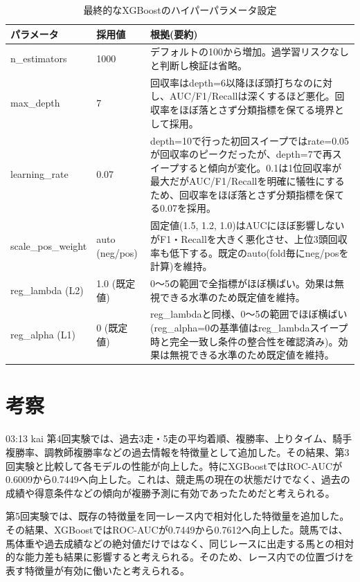 \documentclass[dvipdfmx, a4paper, 11pt, titlepage]{jsarticle}
\begin{document}
\begin{table}[H]
\centering
\caption{最終的なXGBoostのハイパーパラメータ設定}
\begin{tabular}{p{3cm}p{2.5cm}p{8.5cm}}
\toprule
パラメータ & 採用値 & 根拠(要約) \\
\midrule
n\_estimators & 1000 & デフォルトの100から増加。過学習リスクなしと判断し検証は省略。 \\
\addlinespace
max\_depth & 7 & 回収率はdepth=6以降ほぼ頭打ちなのに対し、AUC/F1/Recallは深くするほど悪化。回収率をほぼ落とさず分類指標を保てる境界として採用。 \\
\addlinespace
learning\_rate & 0.07 & depth=10で行った初回スイープではrate=0.05が回収率のピークだったが、depth=7で再スイープすると傾向が変化。0.1は1位回収率が最大だがAUC/F1/Recallを明確に犠牲にするため、回収率をほぼ落とさず分類指標を保てる0.07を採用。 \\
\addlinespace
scale\_pos\_weight & auto (neg/pos) & 固定値(1.5, 1.2, 1.0)はAUCにほぼ影響しないがF1・Recallを大きく悪化させ、上位3頭回収率も低下する。既定のauto(fold毎にneg/posを計算)を維持。 \\
\addlinespace
reg\_lambda (L2) & 1.0 (既定値) & 0〜5の範囲で全指標がほぼ横ばい。効果は無視できる水準のため既定値を維持。 \\
\addlinespace
reg\_alpha (L1) & 0 (既定値) & reg\_lambdaと同様、0〜5の範囲でほぼ横ばい(reg\_alpha=0の基準値はreg\_lambdaスイープ時と完全一致し条件の整合性を確認済み)。効果は無視できる水準のため既定値を維持。 \\
\bottomrule
\end{tabular}
\end{table}

\section{考察}
03:13 kai 第4回実験では、過去3走・5走の平均着順、複勝率、上りタイム、騎手複勝率、調教師複勝率などの過去情報を特徴量として追加した。その結果、第3回実験と比較して各モデルの性能が向上した。特にXGBoostではROC-AUCが0.6009から0.7449へ向上した。これは、競走馬の現在の状態だけでなく、過去の成績や得意条件などの傾向が複勝予測に有効であったためだと考えられる。

第5回実験では、既存の特徴量を同一レース内で相対化した特徴量を追加した。その結果、XGBoostではROC-AUCが0.7449から0.7612へ向上した。競馬では、馬体重や過去成績などの絶対値だけではなく、同じレースに出走する馬との相対的な能力差も結果に影響すると考えられる。そのため、レース内での位置づけを表す特徴量が有効に働いたと考えられる。
\end{document}
